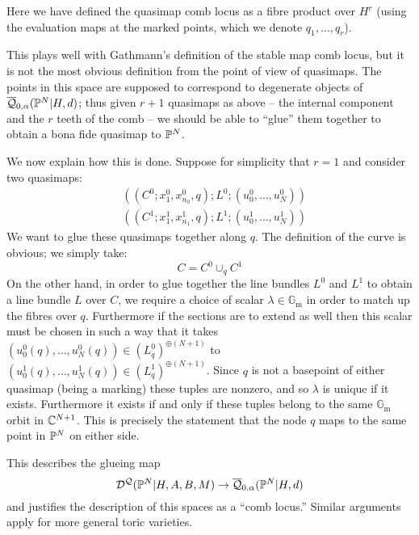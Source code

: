 \begin{remark} \label{Remark on definition of comb locus} Here we have defined the quasimap comb locus as a fibre product over $H^r$ (using the evaluation maps at the marked points, which we denote $q_1, \ldots, q_r$).

This plays well with Gathmann's definition of the stable map comb locus, but it is not the most obvious definition from the point of view of quasimaps. The points in this space are supposed to correspond to degenerate objects of $\overline{\mathcal Q}_{0,\alpha}(\mathbb P^N|H,d)$; thus given $r+1$ quasimaps as above -- the internal component and the $r$ teeth of the comb -- we should be able to ``glue'' them together to obtain a bona fide quasimap to $\mathbb P^N$.

We now explain how this is done. Suppose for simplicity that $r=1$ and consider two quasimaps:
\begin{align*} & ((C^0;x^0_1,x^0_{n_0},q);L^0;(u^0_0, \ldots, u^0_N)) \\
&((C^1;x^1_1,x^1_{n_1},q);L^1;(u^1_0, \ldots, u^1_N)) \end{align*}
We want to glue these quasimaps together along $q$. The definition of the curve is obvious; we simply take:
\begin{equation*} C = C^0 \cup_q C^1 \end{equation*}
On the other hand, in order to glue together the line bundles $L^0$ and $L^1$ to obtain a line bundle $L$ over $C$, we require a choice of scalar $\lambda \in \mathbb{G}_\text{m}$ in order to match up the fibres over $q$. Furthermore if the sections are to extend as well then this scalar must be chosen in such a way that it takes $(u^0_0(q), \ldots, u^0_N(q)) \in (L^0_q)^{\oplus (N+1)}$ to $(u^1_0(q), \ldots, u^1_N(q)) \in (L^1_q)^{\oplus (N+1)}$. Since $q$ is not a basepoint of either quasimap (being a marking) these tuples are nonzero, and so $\lambda$ is unique if it exists. Furthermore it exists if and only if these tuples belong to the same $\mathbb{G}_\text{m}$ orbit in $\mathbb{C}^{N+1}$. This is precisely the statement that the node $q$ maps to the same point in $\mathbb P^N$ on either side.

This describes the glueing map
\begin{equation*} \mathcal{D}^{\mathcal{Q}}(\mathbb P^N|H,A,B,M) \rightarrow \overline{\mathcal Q}_{0,\alpha}(\mathbb P^N|H,d) \end{equation*}
and justifies the description of this spaces as a ``comb locus.'' Similar arguments apply for more general toric varieties. \end{remark}